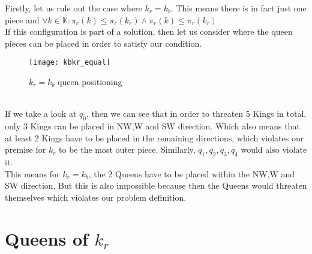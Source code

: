 \documentclass[a4paper,oneside]{scrarticle}
\begin{document}
	Firstly, let us rule out the case where $k_r = k_b$. This means there is in fact just one piece and $\forall k\in\mathbb{K}: \pi_c(k)\leq\pi_c(k_r) \land \pi_r(k)\leq\pi_r(k_r)$\\
	If this configuration is part of a solution, then let us consider where the queen pieces can be placed in order to satisfy our condition.\\
	\begin{figure}[h]
		\centering
		\texttt{[image: kbkr\_equal]}
		\caption{$k_r = k_b$ queen positioning}
		\label{fig:kbkrequal}
	\end{figure}
	\\
	If we take a look at $q_0$, then we can see that in order to threaten 5 Kings in total, only 3 Kings can be placed in NW,W and SW direction. Which also means that at least 2 Kings have to be placed in the remaining directions, which violates our premise for $k_r$ to be the most outer piece. Similarly, $q_1,q_2,q_3,q_4$ would also violate it.\\
	This means for $k_r = k_b$, the 2 Queens have to be placed within the NW,W and SW direction. But this is also impossible because then the Queens would threaten themselves which violates our problem definition.
	
	\section{Queens of $k_r$}
	
\end{document}
